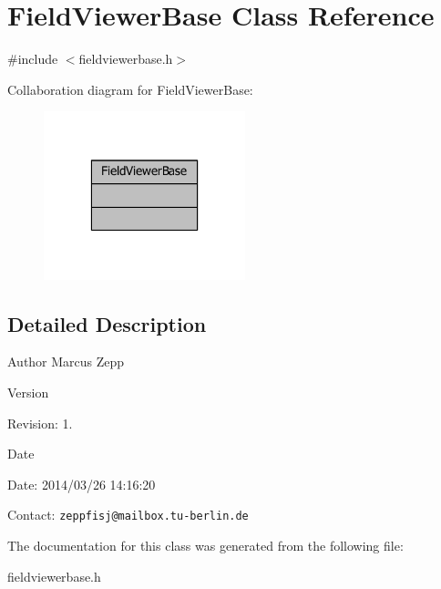 \section{Field\-Viewer\-Base Class Reference}
\label{classFieldViewerBase}


{\ttfamily \#include $<$fieldviewerbase.\-h$>$}



Collaboration diagram for Field\-Viewer\-Base\-:
\nopagebreak
\begin{figure}[H]
\begin{center}
\leavevmode
\includegraphics[width=166pt]{dd/df7/classFieldViewerBase__coll__graph}
\end{center}
\end{figure}


\subsection{Detailed Description}
\begin{DoxyAuthor}{Author}
Marcus Zepp
\end{DoxyAuthor}
\begin{DoxyVersion}{Version}

\end{DoxyVersion}
\begin{DoxyParagraph}{Revision\-:}
1. 
\end{DoxyParagraph}


\begin{DoxyDate}{Date}

\end{DoxyDate}
\begin{DoxyParagraph}{Date\-:}
2014/03/26 14\-:16\-:20 
\end{DoxyParagraph}


Contact\-: {\tt zeppfisj@mailbox.\-tu-\/berlin.\-de} 

The documentation for this class was generated from the following file\-:\begin{DoxyCompactItemize}
\item 
fieldviewerbase.\-h\end{DoxyCompactItemize}
